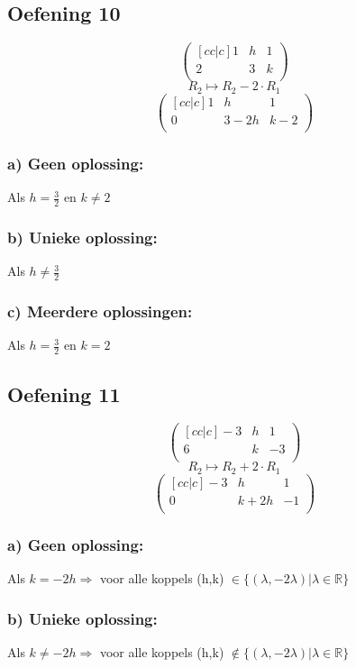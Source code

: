 \documentclass[lineaire_algebra_oplossingen.tex]{subfiles}
\begin{document}
\subsection{Oefening 10}
\[
\begin{pmatrix}[cc|c]
1 & h & 1\\
2 & 3 & k\\
\end{pmatrix}
\]
\[ R_2 \longmapsto R_2 - 2 \cdot R_1\]
\[
\begin{pmatrix}[cc|c]
1 & h & 1\\
0 & 3-2h & k-2\\
\end{pmatrix}
\]
\subsubsection*{a) Geen oplossing:}
Als $h = \frac{3}{2}$ en $k \neq 2$
\subsubsection*{b) Unieke oplossing:}
Als $h \neq \frac{3}{2}$
\subsubsection*{c) Meerdere oplossingen:}
Als $h = \frac{3}{2}$ en $k = 2$

\subsection{Oefening 11}
\[
\begin{pmatrix}[cc|c]
-3 &  h &  1\\
6 &  k &  -3\\
\end{pmatrix}
\]
\[R_2 \longmapsto R_2 + 2\cdot R_1\]
\[
\begin{pmatrix}[cc|c]
-3 &  h &  1\\
0 &  k+2h &  -1\\
\end{pmatrix}
\]
\subsubsection*{a) Geen oplossing:}
Als $k = -2h \Rightarrow$ voor alle koppels (h,k) $\in \{(\lambda, -2\lambda)| \lambda \in \mathbb{R}\}$
\subsubsection*{b) Unieke oplossing:}
Als $k \neq -2h \Rightarrow$ voor alle koppels (h,k) $\not \in \{(\lambda, -2\lambda)| \lambda \in \mathbb{R}\}$
\end{document}
